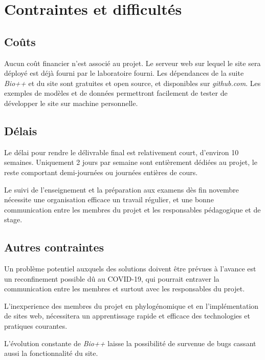 \section{Contraintes et difficultés}

\subsection{Coûts}

Aucun coût financier n'est associé au projet.
Le serveur web sur lequel le site sera déployé est déjà fourni par le laboratoire fourni.
Les dépendances de la suite \textit{Bio++} et du site sont gratuites et open source,
et disponibles sur \textit{github.com}.
Les exemples de modèles et de données permettront facilement
de tester de développer le site sur machine personnelle.


\subsection{Délais}

Le délai pour rendre le délivrable final est relativement court,
d'environ 10 semaines.
Uniquement 2 jours par semaine sont entièrement dédiées au projet,
le reste comportant demi-journées ou journées entières de cours.

Le suivi de l'enseignement et la préparation
aux examens dès fin novembre
nécessite une organisation efficace
un travail régulier,
et une bonne communication entre les membres du projet
et les responsables pédagogique et de stage.


\subsection{Autres contraintes}

Un problème potentiel auxquels des solutions doivent être prévues à l'avance
est un reconfinement possible dû au COVID-19,
qui pourrait entraver la communication entre les membres
et surtout avec les responsables du projet.

L'inexperience des membres du projet en phylogénomique
et en l'implémentation de sites web,
nécessitera un apprentissage rapide et efficace
des technologies et pratiques courantes.

L'évolution constante de \textit{Bio++}
laisse la possibilité de survenue de bugs
cassant aussi la fonctionnalité du site.
